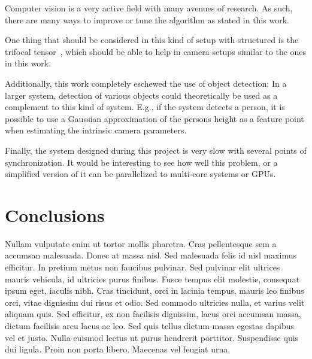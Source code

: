 \documentclass[acmtog]{acmart}
\begin{document}
Computer vision is a very active field with many avenues of research. As such,
there are many ways to improve or tune the algorithm as stated in this work.

One thing that should be considered in this kind of setup with structured is the
trifocal tensor~\cite{Martyushev_2017}, which should be able to help in camera
setups similar to the ones in this work.

Additionally, this work completely eschewed the use of object detection: In a
larger system, detection of various objects could theoretically be used as a
complement to this kind of system. E.g., if the system detects a person, it is
possible to use a Gaussian approximation of the persons height as a feature
point when estimating the intrinsic camera parameters.

Finally, the system designed during this project is very slow with several
points of synchronization. It would be interesting to see how well this problem,
or a simplified version of it can be parallelized to multi-core systems or GPUs.


\section{Conclusions}

Nullam vulputate enim ut tortor mollis pharetra. Cras pellentesque sem a
accumsan malesuada. Donec at massa nisl. Sed malesuada felis id nisl maximus
efficitur. In pretium metus non faucibus pulvinar. Sed pulvinar elit ultrices
mauris vehicula, id ultricies purus finibus. Fusce tempus elit molestie,
consequat ipsum eget, iaculis nibh. Cras tincidunt, orci in lacinia tempus,
mauris leo finibus orci, vitae dignissim dui risus et odio. Sed commodo
ultricies nulla, et varius velit aliquam quis. Sed efficitur, ex non facilisis
dignissim, lacus orci accumsan massa, dictum facilisis arcu lacus ac leo. Sed
quis tellus dictum massa egestas dapibus vel et justo. Nulla euismod lectus ut
purus hendrerit porttitor. Suspendisse quis dui ligula. Proin non porta
libero. Maecenas vel feugiat urna.

\begin{acks}
\end{acks}



\end{document}
